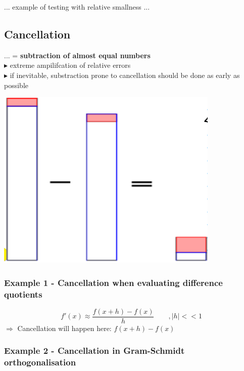 \documentclass[12pt, a4paper]{article}
\begin{document}
	... example of testing with relative smallness ...
	
\hspace{6mm}

	
\subsection{Cancellation}
 

 \begin{minipage}{0.6\textwidth}
 	... = \textbf{subtraction of almost equal numbers} \\
 $\blacktriangleright$ extreme ampilifcation of relative errors \\
 $\blacktriangleright$ if inevitable, substraction prone to cancellation should be done as early as possible
 \end{minipage}
\hfill
 \begin{minipage}{0.3\textwidth}\raggedleft
 		 \includegraphics[width=0.8\textwidth]{cancellation_illustration.png}
 \end{minipage}


\hspace{5mm}
\subsubsection{Example  1 - Cancellation when evaluating difference quotients}
\begin{equation*}
	f'(x) \approx \frac{f(x+h) - f(x)}{h} \quad \quad , |h|<<1	
\end{equation*}
\hspace{10mm}
$\Rightarrow$ Cancellation will happen here: $f(x+h) - f(x)$


\subsubsection{Example  2 - Cancellation in Gram-Schmidt orthogonalisation}
\end{document}
